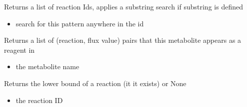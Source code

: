 \documentclass[letterpaper,10pt,english]{sphinxmanual}
\begin{document}
\begin{fulllineitems}
\begin{fulllineitems}
\begin{itemize}
\end{itemize}

\end{fulllineitems}


\begin{fulllineitems}
\label{\detokenize{modules_doc:cbmpy.CBModel.Model.getReactionIds}}
\pysigstartsignatures
{}
\pysigstopsignatures
\sphinxAtStartPar
Returns a list of reaction Ids, applies a substring search if substring is defined
\begin{itemize}
\item {} 
\sphinxAtStartPar
{} search for this pattern anywhere in the id

\end{itemize}

\end{fulllineitems}


\begin{fulllineitems}
\label{\detokenize{modules_doc:cbmpy.CBModel.Model.getReactionIdsAssociatedWithSpecies}}
\pysigstartsignatures
{}
\pysigstopsignatures
\sphinxAtStartPar
Returns a list of (reaction, flux value) pairs that this metabolite appears as a reagent in
\begin{itemize}
\item {} 
\sphinxAtStartPar
{} the metabolite name

\end{itemize}

\end{fulllineitems}


\begin{fulllineitems}
\label{\detokenize{modules_doc:cbmpy.CBModel.Model.getReactionLowerBound}}
\pysigstartsignatures
{}
\pysigstopsignatures
\sphinxAtStartPar
Returns the lower bound of a reaction (it it exists) or None
\begin{itemize}
\item {} 
\sphinxAtStartPar
{} the reaction ID


\end{itemize}
\end{fulllineitems}
\end{fulllineitems}
\end{document}
